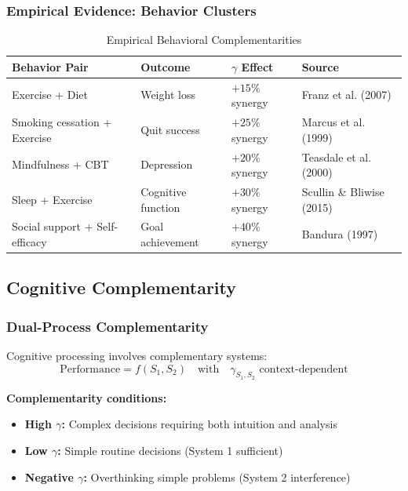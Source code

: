 \subsubsection{Empirical Evidence: Behavior Clusters}

\begin{table}[h]
\centering
\caption{Empirical Behavioral Complementarities}
\label{tab:behavior-gamma}
\renewcommand{\arraystretch}{1.2}
\small
\begin{tabular}{@{}p{4cm}p{2.5cm}p{2cm}l@{}}
\toprule
\textbf{Behavior Pair} & \textbf{Outcome} & \textbf{$\gamma$ Effect} & \textbf{Source} \\
\midrule
Exercise + Diet & Weight loss & $+15\%$ synergy & Franz et al. (2007) \\
Smoking cessation + Exercise & Quit success & $+25\%$ synergy & Marcus et al. (1999) \\
Mindfulness + CBT & Depression & $+20\%$ synergy & Teasdale et al. (2000) \\
Sleep + Exercise & Cognitive function & $+30\%$ synergy & Scullin \& Bliwise (2015) \\
Social support + Self-efficacy & Goal achievement & $+40\%$ synergy & Bandura (1997) \\
\bottomrule
\end{tabular}
\end{table}

\subsection{Cognitive Complementarity}

\subsubsection{Dual-Process Complementarity}

\begin{tcolorbox}[colback=purple!5!white,colframe=purple!75!black,title=\textbf{Kahneman's System 1/System 2 Complementarity}]
Cognitive processing involves complementary systems:
\begin{equation}
\text{Performance} = f(S_1, S_2) \quad \text{with} \quad \gamma_{S_1,S_2} \text{ context-dependent}
\end{equation}

\textbf{Complementarity conditions:}
\begin{itemize}[noitemsep]
    \item \textbf{High $\gamma$:} Complex decisions requiring both intuition and analysis
    \item \textbf{Low $\gamma$:} Simple routine decisions (System 1 sufficient)
    \item \textbf{Negative $\gamma$:} Overthinking simple problems (System 2 interference)
\end{itemize}
\end{tcolorbox}

